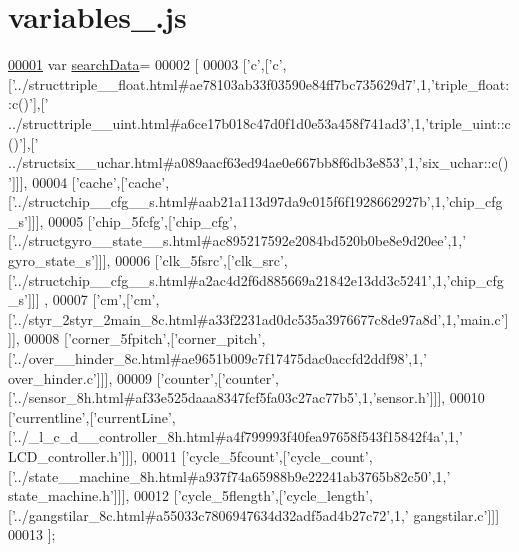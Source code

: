 \hypertarget{variables__3_8js_source}{}\section{variables\+\_.\+js}
\label{variables__3_8js_source}

\begin{DoxyCode}
\hypertarget{variables__3_8js_source.tex_l00001}{}\hyperlink{variables__3_8js_ad01a7523f103d6242ef9b0451861231e}{00001} var \hyperlink{variables__3_8js_ad01a7523f103d6242ef9b0451861231e}{searchData}=
00002 [
00003   [\textcolor{charliteral}{'c'},[\textcolor{charliteral}{'c'},[\textcolor{stringliteral}{'../structtriple\_\_float.html#ae78103ab33f03590e84ff7bc735629d7'},1,\textcolor{stringliteral}{'triple\_float::c()'}],[\textcolor{stringliteral}{'
      ../structtriple\_\_uint.html#a6ce17b018c47d0f1d0e53a458f741ad3'},1,\textcolor{stringliteral}{'triple\_uint::c()'}],[\textcolor{stringliteral}{'
      ../structsix\_\_uchar.html#a089aacf63ed94ae0e667bb8f6db3e853'},1,\textcolor{stringliteral}{'six\_uchar::c()'}]]],
00004   [\textcolor{stringliteral}{'cache'},[\textcolor{stringliteral}{'cache'},[\textcolor{stringliteral}{'../structchip\_\_cfg\_\_s.html#aab21a113d97da9c015f6f1928662927b'},1,\textcolor{stringliteral}{'chip\_cfg\_s'}]]],
00005   [\textcolor{stringliteral}{'chip\_5fcfg'},[\textcolor{stringliteral}{'chip\_cfg'},[\textcolor{stringliteral}{'../structgyro\_\_state\_\_s.html#ac895217592e2084bd520b0be8e9d20ee'},1,\textcolor{stringliteral}{'
      gyro\_state\_s'}]]],
00006   [\textcolor{stringliteral}{'clk\_5fsrc'},[\textcolor{stringliteral}{'clk\_src'},[\textcolor{stringliteral}{'../structchip\_\_cfg\_\_s.html#a2ac4d2f6d885669a21842e13dd3c5241'},1,\textcolor{stringliteral}{'chip\_cfg\_s'}]]]
      ,
00007   [\textcolor{stringliteral}{'cm'},[\textcolor{stringliteral}{'cm'},[\textcolor{stringliteral}{'../styr\_2styr\_2main\_8c.html#a33f2231ad0dc535a3976677c8de97a8d'},1,\textcolor{stringliteral}{'main.c'}]]],
00008   [\textcolor{stringliteral}{'corner\_5fpitch'},[\textcolor{stringliteral}{'corner\_pitch'},[\textcolor{stringliteral}{'../over\_\_hinder\_8c.html#ae9651b009c7f17475dac0accfd2ddf98'},1,\textcolor{stringliteral}{'
      over\_hinder.c'}]]],
00009   [\textcolor{stringliteral}{'counter'},[\textcolor{stringliteral}{'counter'},[\textcolor{stringliteral}{'../sensor\_8h.html#af33e525daaa8347fcf5fa03c27ac77b5'},1,\textcolor{stringliteral}{'sensor.h'}]]],
00010   [\textcolor{stringliteral}{'currentline'},[\textcolor{stringliteral}{'currentLine'},[\textcolor{stringliteral}{'../\_l\_c\_d\_\_controller\_8h.html#a4f799993f40fea97658f543f15842f4a'},1,\textcolor{stringliteral}{'
      LCD\_controller.h'}]]],
00011   [\textcolor{stringliteral}{'cycle\_5fcount'},[\textcolor{stringliteral}{'cycle\_count'},[\textcolor{stringliteral}{'../state\_\_machine\_8h.html#a937f74a65988b9e22241ab3765b82c50'},1,\textcolor{stringliteral}{'
      state\_machine.h'}]]],
00012   [\textcolor{stringliteral}{'cycle\_5flength'},[\textcolor{stringliteral}{'cycle\_length'},[\textcolor{stringliteral}{'../gangstilar\_8c.html#a55033c7806947634d32adf5ad4b27c72'},1,\textcolor{stringliteral}{'
      gangstilar.c'}]]]
00013 ];
\end{DoxyCode}

